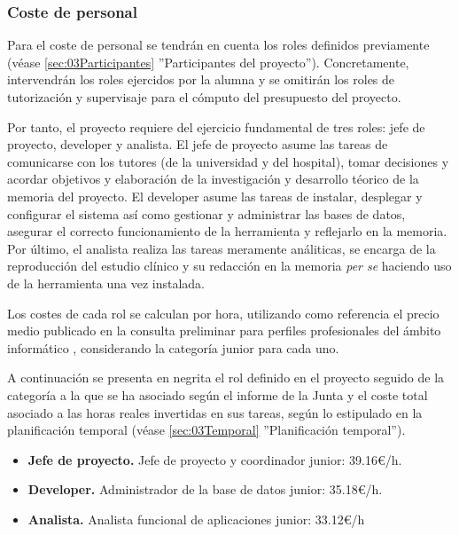 \subsubsection{Coste de personal}

Para el coste de personal se tendrán en cuenta los roles definidos previamente (véase \ref{sec:03Participantes} ''Participantes del proyecto''). Concretamente, intervendrán los roles ejercidos por la alumna y se omitirán los roles de tutorización y supervisaje para el cómputo del presupuesto del proyecto.

Por tanto, el proyecto requiere del ejercicio fundamental de tres roles: jefe de proyecto, developer y analista. El jefe de proyecto asume las tareas de comunicarse con los tutores (de la universidad y del hospital), tomar decisiones y acordar objetivos y elaboración de la investigación y desarrollo téorico de la memoria del proyecto. El developer asume las tareas de instalar, desplegar y configurar el sistema así como gestionar y administrar las bases de datos, asegurar el correcto funcionamiento de la herramienta y reflejarlo en la memoria. Por último, el analista realiza las tareas meramente análiticas, se encarga de la reproducción del estudio clínico y su redacción en la memoria \textit{per se} haciendo uso de la herramienta una vez instalada.

Los costes de cada rol se calculan por hora, utilizando como referencia el precio medio publicado en la consulta preliminar para perfiles profesionales del ámbito informático \cite{informeJuntaAndalucia}, considerando la categoría junior para cada uno. 

A continuación se presenta en negrita el rol definido en el proyecto seguido de la categoría a la que se ha asociado según el informe de la Junta y el coste total asociado a las horas reales invertidas en sus tareas, según lo estipulado en la planificación temporal (véase \ref{sec:03Temporal} ''Planificación temporal'').

\begin{itemize}
    \item \textbf{Jefe de proyecto.} Jefe de proyecto y coordinador junior: 39.16€/h.


    \item \textbf{Developer.} Administrador de la base de datos junior: 35.18€/h.


    \item \textbf{Analista.} Analista funcional de aplicaciones junior: 33.12€/h


\end{itemize}

